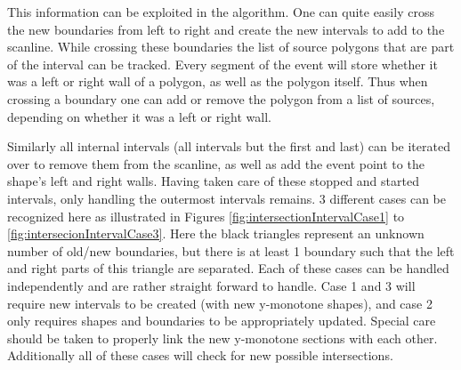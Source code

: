 \documentclass[12pt]{article}
\begin{document}
This information can be exploited in the algorithm. One can quite easily cross the new boundaries from left to right and create the new intervals to add to the scanline. While crossing these boundaries the list of source polygons that are part of the interval can be tracked. Every segment of the event will store whether it was a left or right wall of a polygon, as well as the polygon itself. Thus when crossing a boundary one can add or remove the polygon from a list of sources, depending on whether it was a left or right wall.

Similarly all internal intervals (all intervals but the first and last) can be iterated over to remove them from the scanline, as well as add the event point to the shape's left and right walls.
Having taken care of these stopped and started intervals, only handling the outermost intervals remains. 3 different cases can be recognized here as illustrated in Figures \ref{fig:intersectionIntervalCase1} to \ref{fig:intersecionIntervalCase3}. Here the black triangles represent an unknown number of old/new boundaries, but there is at least 1 boundary such that the left and right parts of this triangle are separated. Each of these cases can be handled independently and are rather straight forward to handle. Case 1 and 3 will require new intervals to be created (with new y-monotone shapes), and case 2 only requires shapes and boundaries to be appropriately updated. Special care should be taken to properly link the new y-monotone sections with each other. Additionally all of these cases will check for new possible intersections.
\end{document}
